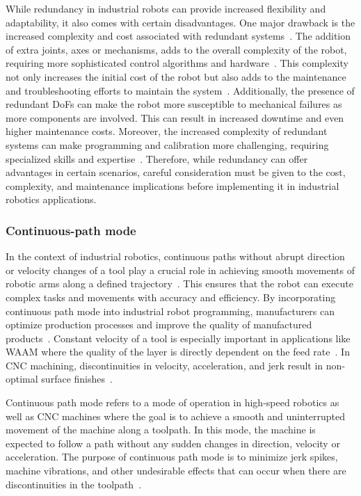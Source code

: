While redundancy in industrial robots can provide increased flexibility and adaptability, it also comes with certain disadvantages. One major drawback is the increased complexity and cost associated with redundant systems~\cite{Halevi.2011}. The addition of extra joints, axes or mechanisms, adds to the overall complexity of the robot, requiring more sophisticated control algorithms and hardware~\cite{Duong.2021}. This complexity not only increases the initial cost of the robot but also adds to the maintenance and troubleshooting efforts to maintain the system~\cite{Ahangar.2019}. Additionally, the presence of redundant \acrshort{DoF}s can make the robot more susceptible to mechanical failures as more components are involved. This can result in increased downtime and even higher maintenance costs. Moreover, the increased complexity of redundant systems can make programming and calibration more challenging, requiring specialized skills and expertise~\cite{Erdos.2016}. Therefore, while redundancy can offer advantages in certain scenarios, careful consideration must be given to the cost, complexity, and maintenance implications before implementing it in industrial robotics applications.




\subsubsection{Continuous-path mode}\label{CPM}
In the context of industrial robotics, continuous paths without abrupt direction or velocity changes of a tool play a crucial role in achieving smooth movements of robotic arms along a defined trajectory~\cite{Jia.2018}. This ensures that the robot can execute complex tasks and movements with accuracy and efficiency. By incorporating continuous path mode into industrial robot programming, manufacturers can optimize production processes and improve the quality of manufactured products~\cite{Zhang.2020}. Constant velocity of a tool is especially important in applications like \acrshort{WAAM} where the quality of the layer is directly dependent on the feed rate~\cite{Li.2018b}. In \acrshort{CNC} machining, discontinuities in velocity, acceleration, and jerk result in non-optimal surface finishes~\cite{Sun.2021}.


Continuous path mode refers to a mode of operation in high-speed robotics as well as \acrshort{CNC} machines where the goal is to achieve a smooth and uninterrupted movement of the machine along a toolpath. In this mode, the machine is expected to follow a path without any sudden changes in direction, velocity or acceleration. The purpose of continuous path mode is to minimize jerk spikes, machine vibrations, and other undesirable effects that can occur when there are discontinuities in the toolpath~\cite{Jia.2018, Yang.2017}.


